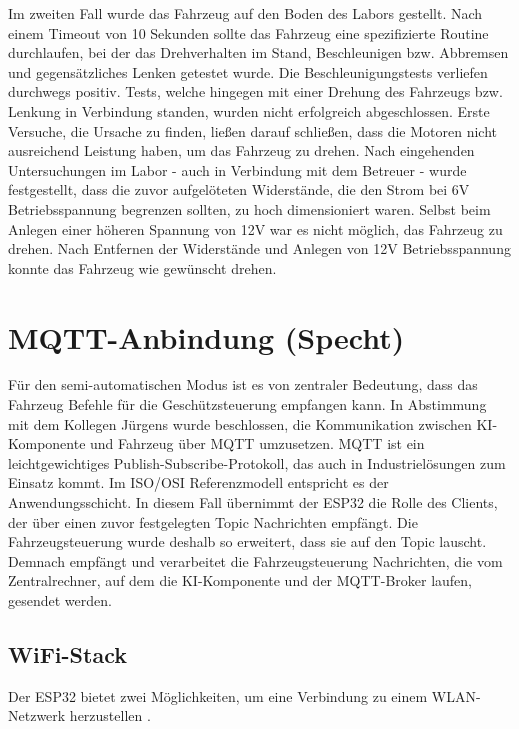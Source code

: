 Im zweiten Fall wurde das Fahrzeug auf den Boden des Labors gestellt. Nach einem Timeout von 10 Sekunden sollte das Fahrzeug eine spezifizierte Routine durchlaufen, bei der das Drehverhalten im Stand, Beschleunigen bzw. Abbremsen und gegensätzliches Lenken getestet wurde. Die Beschleunigungstests verliefen durchwegs positiv. Tests, welche hingegen mit einer Drehung des Fahrzeugs bzw. Lenkung in Verbindung standen, wurden nicht erfolgreich abgeschlossen. Erste Versuche, die Ursache zu finden, ließen darauf schließen, dass die Motoren nicht ausreichend Leistung haben, um das Fahrzeug zu drehen. Nach eingehenden Untersuchungen im Labor - auch in Verbindung mit dem Betreuer - wurde festgestellt, dass die zuvor aufgelöteten Widerstände, die den Strom bei 6V Betriebsspannung begrenzen sollten, zu hoch dimensioniert waren. Selbst beim Anlegen einer höheren Spannung von 12V war es nicht möglich, das Fahrzeug zu drehen. Nach Entfernen der Widerstände und Anlegen von 12V Betriebsspannung konnte das Fahrzeug wie gewünscht drehen. \newline

\section{MQTT-Anbindung (Specht)}

Für den semi-automatischen Modus ist es von zentraler Bedeutung, dass das Fahrzeug Befehle für die Geschützsteuerung empfangen kann. In Abstimmung mit dem Kollegen Jürgens wurde beschlossen, die Kommunikation zwischen KI-Komponente und Fahrzeug über MQTT umzusetzen. MQTT ist ein leichtgewichtiges Publish-Subscribe-Protokoll, das auch in Industrielösungen zum Einsatz kommt. Im ISO/OSI Referenzmodell entspricht es der Anwendungsschicht. In diesem Fall übernimmt der ESP32 die Rolle des Clients, der über einen zuvor festgelegten Topic Nachrichten empfängt. Die Fahrzeugsteuerung wurde deshalb so erweitert, dass sie auf den Topic lauscht. Demnach empfängt und verarbeitet die Fahrzeugsteuerung Nachrichten, die vom Zentralrechner, auf dem die KI-Komponente und der MQTT-Broker laufen, gesendet werden. \newline

\subsection{WiFi-Stack}

Der ESP32 bietet zwei Möglichkeiten, um eine Verbindung zu einem WLAN-Netzwerk herzustellen \cite{esp32_wifi_getting_started}. \newline


